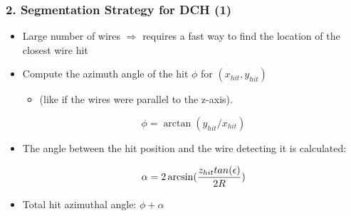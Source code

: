 \documentclass[aspectratio=169, hyperref={colorlinks=true,pdfpagelabels=false,linkcolor=black}, xcolor=dvipsnames,10pt]{beamer}
\begin{document}
\begin{frame}
  \frametitle{2. Segmentation Strategy for DCH (1)}


    \begin{itemize}
    \item Large number of wires $\Rightarrow$ requires a fast way to find the
      location of the closest wire hit
    \item Compute the azimuth angle of the hit $\phi$ for $(x_{hit},
      y_{hit})$ 
      \begin{itemize}
      \item (like if the wires were parallel to the z-axis).
      \end{itemize}

    \begin{equation}
      \phi = \arctan(y_{hit}/x_{hit})
    \end{equation}

    \item The angle between the hit position and the wire detecting it
      is calculated:

    \begin{equation}
      \alpha = 2 \arcsin({{z_{hit} tan(\epsilon)} \over {2R}})
    \end{equation}
  \item Total hit azimuthal angle: $\phi+\alpha$
    \end{itemize}


    \begin{columns}


\end{columns}
\end{frame}
\end{document}
